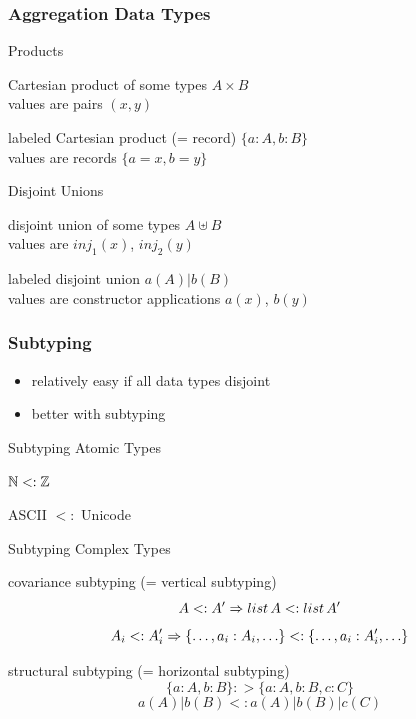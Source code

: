 \begin{frame}\frametitle{Aggregation Data Types}
\begin{blockitems}{Products}
 \item Cartesian product of some types $A\times B$ \\
 values are pairs $(x,y)$ 
 \item labeled Cartesian product (= record) $\{a: A, b: B\}$ \\
 values are records $\{a=x, b=y\}$
\end{blockitems}

\begin{blockitems}{Disjoint Unions}
 \item disjoint union of some types $A\uplus B$\\
  values are $inj_1(x)$, $inj_2(y)$
 \item labeled disjoint union $a(A)|b(B)$ \\
  values are constructor applications $a(x)$, $b(y)$
\end{blockitems}

\end{frame}

\begin{frame}\frametitle{Subtyping}
\begin{itemize}
 \item relatively easy if all data types disjoint
 \item better with subtyping
\end{itemize}

\begin{blockitems}{Subtyping Atomic Types}
 \item $\mathbb{N} <: \mathbb{Z}$
 \item ASCII $<:$ Unicode
\end{blockitems}

\begin{blockitems}{Subtyping Complex Types}
 \item covariance subtyping (= vertical subtyping)
  \[A <: A' \Rightarrow list\,A <: list\, A'\]
  \[A_i <: A_i' \Rightarrow \{\ldots, a_i:A_i,\ldots\} <: \{\ldots, a_i:A'_i,\ldots\}\]
 \item structural subtyping (= horizontal subtyping)
  \[\{a:A,b:B\} :> \{a:A,b:B,c:C\}\]
  \[a(A)|b(B) <: a(A)|b(B)|c(C)\]
\end{blockitems}
\end{frame}

